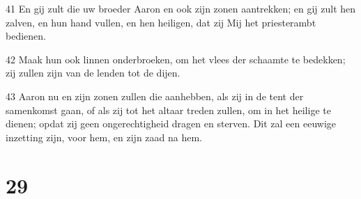 \par 41 En gij zult die uw broeder Aaron en ook zijn zonen aantrekken; en gij zult hen zalven, en hun hand vullen, en hen heiligen, dat zij Mij het priesterambt bedienen.
\par 42 Maak hun ook linnen onderbroeken, om het vlees der schaamte te bedekken; zij zullen zijn van de lenden tot de dijen.
\par 43 Aaron nu en zijn zonen zullen die aanhebben, als zij in de tent der samenkomst gaan, of als zij tot het altaar treden zullen, om in het heilige te dienen; opdat zij geen ongerechtigheid dragen en sterven. Dit zal een eeuwige inzetting zijn, voor hem, en zijn zaad na hem.

\chapter{29}

